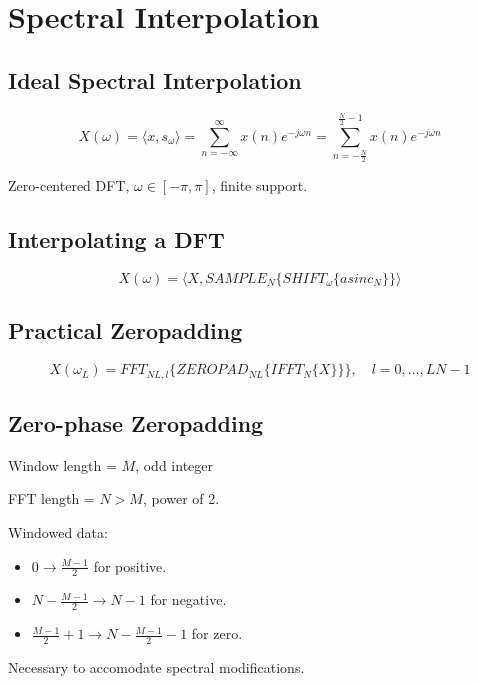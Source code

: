 \documentclass[11pt]{article}
\begin{document}
\section*{Spectral Interpolation} \indent

\subsection*{Ideal Spectral Interpolation} \indent

\[X(\omega) = \langle x, s_\omega \rangle = \sum_{n=-\infty}^{\infty} x(n) e^{-j\omega n} = \sum_{n=-\frac{N}{2}}^{\frac{N}{2}-1} x(n)e^{-j\omega n}\]

Zero-centered DFT, $\omega \in [-\pi, \pi]$, finite support.

\subsection*{Interpolating a DFT}

\[X(\omega) = \langle X, SAMPLE_N\{SHIFT_\omega\{asinc_N\}\}\rangle\]

\subsection*{Practical Zeropadding}

\[X(\omega_L) = FFT_{NL, l}\{ZEROPAD_{NL}\{IFFT_N\{X\}\}\}, \quad l = 0, ..., LN-1\]

\subsection*{Zero-phase Zeropadding} \indent

Window length = $M$, odd integer

FFT length = $N > M$, power of 2.

Windowed data:
\begin{itemize}
\item $0 \to \frac{M-1}{2}$ for positive.
\item $N - \frac{M-1}{2} \to N-1$ for negative.
\item $\frac{M-1}{2} + 1 \to N - \frac{M-1}{2} - 1$ for zero.
\end{itemize}

Necessary to accomodate spectral modifications.
\end{document}

